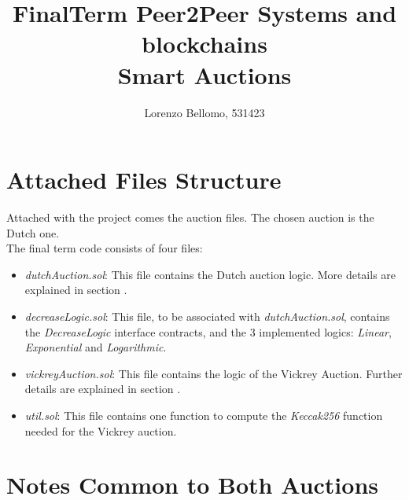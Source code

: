 \documentclass[11pt, a4paper]{report}
\title{
	FinalTerm Peer2Peer Systems and blockchains \\
	\large Smart Auctions}
\author{Lorenzo Bellomo, 531423}
\date{}
\begin{document}
	\maketitle
	
\section*{Attached Files Structure}

	Attached with the project comes the auction files. The chosen auction is the Dutch one. \\
	The final term code consists of four files:
	\begin{itemize}
		\item \emph{dutchAuction.sol}: This file contains the Dutch auction logic. More details are explained in section .
		\item \emph{decreaseLogic.sol}: This file, to be associated with \emph{dutchAuction.sol}, contains the \emph{DecreaseLogic} interface contracts, and the 3 implemented logics: \emph{Linear}, \emph{Exponential} and \emph{Logarithmic}.
		\item \emph{vickreyAuction.sol}: This file contains the logic of the Vickrey Auction. Further details are explained in section .
		\item \emph{util.sol}: This file contains one function to compute the \emph{Keccak256} function needed for the Vickrey auction.
	\end{itemize}

\section*{Notes Common to Both Auctions}
\label{sec:common}
\end{document}

